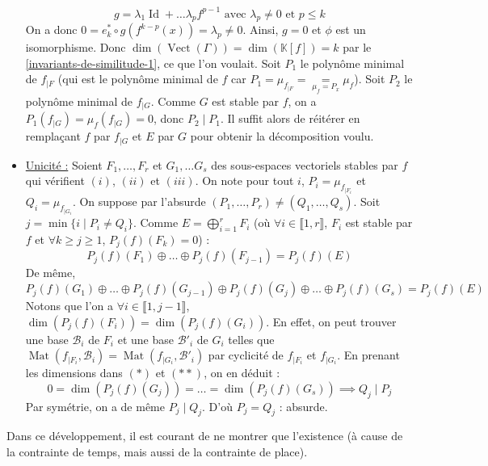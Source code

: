 \begin{demonstration}
\begin{itemize}
			\[ g = \lambda_1 \operatorname{Id} + \dots \lambda_p f^{p-1} \text{ avec } \lambda_p \neq 0 \text{ et } p \leq k \]
			On a donc $0 = e_k^* \circ g(f^{k-p} (x)) = \lambda_p \neq 0$. Ainsi, $g = 0$ et $\phi$ est un isomorphisme. Donc $\dim(\operatorname{Vect}(\Gamma)) = \dim(\mathbb{K}[f]) = k$ par le \cref{invariants-de-similitude-1}, ce que l'on voulait.
			\newpar
			Soit $P_1$ le polynôme minimal de $f_{|F}$ (qui est le polynôme minimal de $f$ car $P_1 = \mu_{f_{|F}} = \underset{\mu_f = P_x}{=} \mu_f$). Soit $P_2$ le polynôme minimal de $f_{|G}$. Comme $G$ est stable par $f$, on a $P_1(f_{|G}) = \mu_f(f_{|G}) = 0$, donc $P_2 \mid P_1$. Il suffit alors de réitérer en remplaçant $f$ par $f_{|G}$ et $E$ par $G$ pour obtenir la décomposition voulu.
			\item \underline{Unicité :} Soient $F_1, \dots, F_r$ et $G_1, \dots G_s$ des sous-espaces vectoriels stables par $f$ qui vérifient $(i)$, $(ii)$ et $(iii)$. On note pour tout $i$, $P_i = \mu_{f_{|F_i}}$ et $Q_i = \mu_{f_{|G_i}}$. On suppose par l'absurde $(P_1, \dots, P_r) \neq (Q_1, \dots, Q_s)$. Soit $j = \min\{ i \mid P_i \neq Q_i \}$.
			Comme $E = \bigoplus_{i = 1}^r F_i$ (où $\forall i \in \llbracket 1, r \rrbracket$, $F_i$ est stable par $f$ et $\forall k \geq j \geq 1$, $P_j(f)(F_k) = 0$) :
			\[ P_j(f)(F_1) \oplus \dots \oplus P_j(f)(F_{j-1}) = P_j(f)(E) \tag{$*$} \]
			De même,
			\[ P_j(f)(G_1) \oplus \dots \oplus P_j(f)(G_{j-1}) \oplus P_j(f)(G_j) \oplus \dots \oplus P_j(f)(G_s) = P_j(f)(E) \tag{$**$} \]
			Notons que l'on a $\forall i \in \llbracket 1, j-1 \rrbracket$, $\dim(P_j(f)(F_i)) = \dim(P_j(f)(G_i))$. En effet, on peut trouver une base $\mathcal{B}_i$ de $F_i$ et une base $\mathcal{B}'_i$ de $G_i$ telles que $\operatorname{Mat}(f_{|F_i}, \mathcal{B}_i) = \operatorname{Mat}(f_{|G_i}, \mathcal{B}'_i)$ par cyclicité de $f_{|F_i}$ et $f_{|G_i}$. En prenant les dimensions dans $(*)$ et $(**)$, on en déduit :
			\[ 0 = \dim(P_j(f)(G_j)) = \dots = \dim(P_j(f)(G_s)) \implies Q_j \mid P_j \]
			Par symétrie, on a de même $P_j \mid Q_j$. D'où $P_j = Q_j$ : absurde.
		\end{itemize}
	\end{demonstration}

	\begin{remark}
		Dans ce développement, il est courant de ne montrer que l'existence (à cause de la contrainte de temps, mais aussi de la contrainte de place).
	\end{remark}

